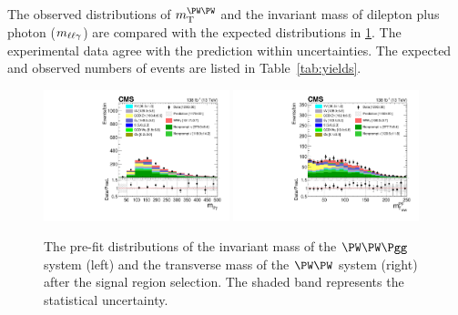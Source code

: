 The observed distributions of $\mTWW$ and the invariant mass of dilepton plus photon ($m_{\ell\ell\gamma}$) are compared with the expected distributions in \ref{fig:plots_WWgammarun2}. The experimental data agree with the prediction within uncertainties. The expected and observed numbers of events are listed in Table~\ref{tab:yields}.

\begin{figure}[htp]
     \centering      
      \includegraphics[width=0.48\textwidth]{unblind_SRCR/SR_prefit/can_mllg_emu.pdf}
      \includegraphics[width=0.48\textwidth]{unblind_SRCR/SR_prefit/can_mT_pf_emu.pdf}      
    \caption{The pre-fit distributions of the invariant mass of the $\PW\PW\Pgg$ system (left) and the transverse mass of the $\PW\PW$ system (right) after the signal region selection. The shaded band represents the statistical uncertainty.}
        \label{fig:plots_WWgammarun2}
     
\end{figure}

